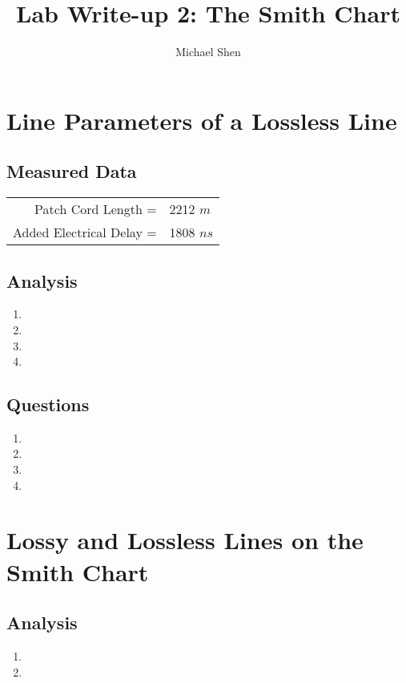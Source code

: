 \documentclass{article}
\begin{document}
\title{Lab Write-up 2: The Smith Chart}
\author{Michael Shen}
\maketitle

\section{Line Parameters of a Lossless Line}
\subsection{Measured Data}
\begin{table}[h]
\centering
	\begin{tabular}{rl}
	Patch Cord Length =  	  & 2212 $m$  \\
	Added Electrical Delay =  & 1808 $ns$      
	\end{tabular}
\end{table}
\subsection{Analysis}
\begin{enumerate}
	\item
	\item
	\item
	\item
\end{enumerate}
\subsection{Questions}
\begin{enumerate}
	\item
	\item
	\item
	\item
\end{enumerate}

\section{Lossy and Lossless Lines on the Smith Chart}
\subsection{Analysis}
\begin{enumerate}
	\item
	\item
\end{enumerate}
\end{document}
